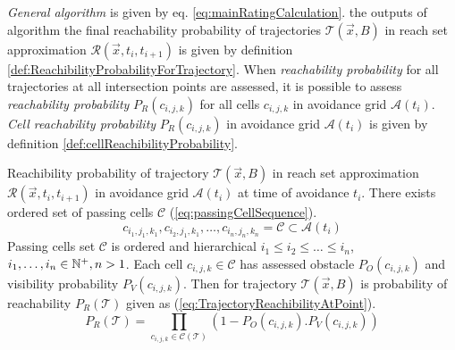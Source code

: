 \noindent\emph{General algorithm} is given by eq. \ref{eq:mainRatingCalculation}. the outputs of algorithm the final reachability probability of trajectories $\mathscr{T}(\vec{x},B)$ in reach set approximation $\mathscr{R}(\vec{x},t_i,t_{i+1})$ is given by definition \ref{def:ReachibilityProbabilityForTrajectory}. When \emph{reachability probability} for all trajectories at all intersection points are assessed, it is possible to assess \emph{reachability probability} $P_R(c_{i,j,k})$ for all cells $c_{i,j,k}$ in avoidance grid $\mathscr{A}(t_i)$. \emph{Cell reachability probability} $P_R(c_{i,j,k})$ in avoidance grid $\mathscr{A}(t_i)$ is given by definition \ref{def:cellReachibilityProbability}.

\begin{definition}{Reachibility probability of trajectory}\label{def:ReachibilityProbabilityForTrajectory} $\mathscr{T}(\vec{x},B)$ in reach set approximation $\mathscr{R}(\vec{x},t_i,t_{i+1})$ in avoidance grid $\mathscr{A}(t_i)$ at time of avoidance $t_i$. There exists ordered set of passing cells $\mathscr{C}$ (\ref{eq:passingCellSequence}).  
    \begin{equation}\label{eq:passingCellSequence}
        {c_{i_1,j_1,k_1},c_{i_2,j_1,k_1},\dots,c_{i_n,j_n,k_n}}=\mathscr{C}\subset\mathscr{A}(t_i)
    \end{equation}
Passing cells set $\mathscr{C}$ is ordered and hierarchical $i_1\le i_2 \le \dots \le i_n$, $i_1,\dots,i_n\in\mathbb{N}^+,n>1$. Each cell $c_{i,j,k}\in\mathscr{C}$ has assessed obstacle $P_O(c_{i,j,k})$ and visibility probability $P_V(c_{i,j,k})$. Then for trajectory $\mathscr{T}(\vec{x},B)$ is probability of reachability $P_R\left ( \mathscr{T}\right)$ given as (\ref{eq:TrajectoryReachibilityAtPoint}).
    \begin{equation}\label{eq:TrajectoryReachibilityAtPoint}
        P_R\left ( \mathscr{T}\right )=\prod_{c_{i,j,k}\in\mathscr{C}(\mathscr{T})}\left(1-P_O(c_{i,j,k}).P_V(c_{i,j,k})\right)
    \end{equation}
\end{definition}


